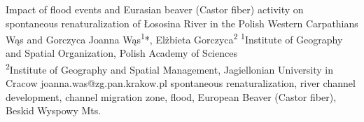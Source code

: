\abstract
{Impact of flood events and Eurasian beaver (Castor fiber) activity on spontaneous renaturalization of Łososina River in the Polish Western Carpathians} %
{Wąs and Gorczyca} %
{Joanna Wąs\textsuperscript{1}*, Elżbieta Gorczyca\textsuperscript{2}} %
{\POtag} %
{\textsuperscript{1}Institute of Geography and Spatial Organization, Polish Academy of Sciences\\
	\textsuperscript{2}Institute of Geography and Spatial Management, Jagiellonian University in Cracow} %
{joanna.was@zg.pan.krakow.pl}  %
{spontaneous renaturalization, river channel development, channel migration zone, flood, European Beaver (Castor fiber), Beskid Wyspowy Mts.}%
